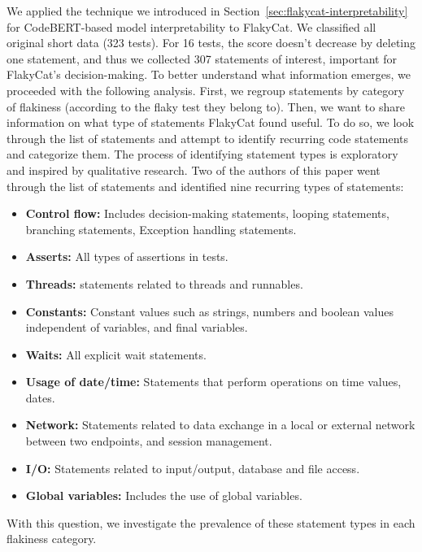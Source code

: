 \begin{itemize}[label={}]
We applied the technique we introduced in Section~\ref{sec:flakycat-interpretability} for CodeBERT-based model interpretability to FlakyCat. 
We classified all original short data (323 tests). For 16 tests, the score doesn't decrease by deleting one statement, and thus we collected 307 statements of interest, important for FlakyCat's decision-making. 
To better understand what information emerges, we proceeded with the following analysis. First, we regroup statements by category of flakiness (according to the flaky test they belong to). Then, we want to share information on what type of statements FlakyCat found useful. To do so, we look through the list of statements and attempt to identify recurring code statements and categorize them. The process of identifying statement types is exploratory and inspired by qualitative research. Two of the authors of this paper went through the list of statements and identified nine recurring types of statements:
\begin{itemize}
 \item \textbf{Control flow:} Includes decision-making statements, looping statements, branching statements, Exception handling statements.
 \item \textbf{Asserts:} All types of assertions in tests. 
 \item \textbf{Threads:} statements related to threads and runnables. 
 \item \textbf{Constants:} Constant values such as strings, numbers and boolean values independent of variables, and final variables. 
 \item \textbf{Waits:} All explicit wait statements. 
 \item \textbf{Usage of date/time:} Statements that perform operations on time values, dates. 
 \item \textbf{Network:} Statements related to data exchange in a local or external network between two endpoints, and session management. 
 \item \textbf{I/O:} Statements related to input/output, database and file access. 
 \item \textbf{Global variables:} Includes the use of global variables. 
\end{itemize}

\end{itemize}
With this question, we investigate the prevalence of these statement types in each flakiness category.